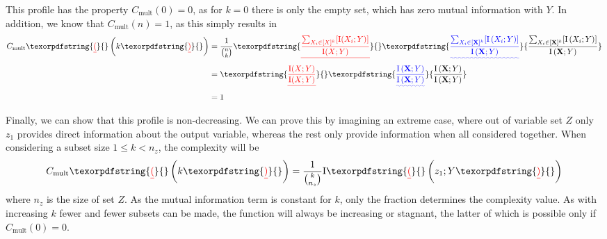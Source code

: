 \documentclass{article}
\providecommand{\DIFaddtex}[1]{{\protect\color{blue}\uwave{#1}}} %
\providecommand{\DIFdeltex}[1]{{\protect\color{red}\sout{#1}}}                      %
\providecommand{\DIFaddbegin}{} %
\providecommand{\DIFaddend}{} %
\providecommand{\DIFdelbegin}{} %
\providecommand{\DIFdelend}{} %
\providecommand{\DIFadd}[1]{\texorpdfstring{\DIFaddtex{#1}}{#1}} %
\providecommand{\DIFdel}[1]{\texorpdfstring{\DIFdeltex{#1}}{}} %
\begin{document}
This profile has the property \DIFdelbegin \DIFdel{$C_\mathrm{mult}(0) = 0$}\DIFdelend \DIFaddbegin \DIFadd{$C_\mathrm{mult}\left( 0 \right) = 0$}\DIFaddend , as for $k = 0$ there is only the empty set, which has zero mutual information with $Y$.
In addition, we know that \DIFdelbegin \DIFdel{$C_\mathrm{mult}(n) = 1$}\DIFdelend \DIFaddbegin \DIFadd{$C_\mathrm{mult}\left( n\right) = 1$}\DIFaddend , as this simply results in
%
\begin{align}
C_\mathrm{mult}\DIFdelbegin \DIFdel{(}\DIFdelend \DIFaddbegin \left( \DIFaddend k \DIFdelbegin \DIFdel{) 
}\DIFdelend \DIFaddbegin \right)  
\DIFaddend &= \frac{1}{\binom{n}{k}}\DIFdelbegin \DIFdel{\frac{\sum_{X_i \in [X]^k} [\mathrm{I}(X_i;Y)]}{\mathrm{I}(X;Y)} }\DIFdelend \DIFaddbegin \DIFadd{\frac{\sum_{X_i \in [\mathbf{X}]^k} [\mathrm{I}\left( X_i;Y\right)]}{\mathrm{I}\left( \mathbf{X};Y\right)} }\DIFaddend \\
&= \DIFdelbegin \DIFdel{\frac{\mathrm{I}(X;Y)}{\mathrm{I}(X;Y)} }\DIFdelend \DIFaddbegin \DIFadd{\frac{\mathrm{I}\left( \mathbf{X};Y\right)}{\mathrm{I}\left( \mathbf{X};Y\right)} }\DIFaddend \\
&= 1
\end{align}

Finally, we can show that this profile is non-decreasing.
We can prove this by imagining an extreme case, where out of variable set $Z$ only $z_1$ provides direct information about the output variable, whereas the rest only provide information when all considered together.
When considering a subset size $1 \le k < n_z $, the complexity will be
%
\begin{equation}
C_\mathrm{mult}\DIFdelbegin \DIFdel{(}\DIFdelend \DIFaddbegin \left( \DIFaddend k \DIFdelbegin \DIFdel{) }\DIFdelend \DIFaddbegin \right)  \DIFaddend = \frac{1}{\binom{k}{n_z}} \mathrm{I}\DIFdelbegin \DIFdel{(}\DIFdelend \DIFaddbegin \left( \DIFaddend z_1;Y\DIFdelbegin \DIFdel{)
}\DIFdelend \DIFaddbegin \right)
\DIFaddend \end{equation}
%
where $n_z$ is the size of set $Z$.
As the mutual information term is constant for $k$, only the fraction determines the complexity value.
As with increasing $k$ fewer and fewer subsets can be made, the function will always be increasing or stagnant, the latter of which is possible only if \DIFdelbegin \DIFdel{$C_\mathrm{mult}(0) = 0$}\DIFdelend \DIFaddbegin \DIFadd{$C_\mathrm{mult}\left( 0 \right) = 0$}\DIFaddend .
\end{document}

